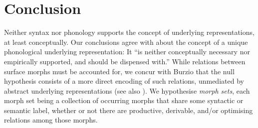 \section{Conclusion}

Neither syntax nor phonology supports the concept of underlying representations, at least conceptually. Our conclusions agree with \citet[123]{Burzio:1996} about the concept of a unique phonological underlying representation: It ``is neither conceptually necessary nor empirically supported, and should be dispensed with.'' While relations between surface morphs must be accounted for, we concur with Burzio that the null hypothesis consists of a more direct encoding of such relations, unmediated by abstract underlying representations (see also \citealt{vandeWeijer:2012}). We hypothesise {\it morph sets}, each morph set being a collection of occurring  morphs that share some syntactic or semantic label, whether or not there are productive, derivable, and/or optimising relations among those morphs.  

